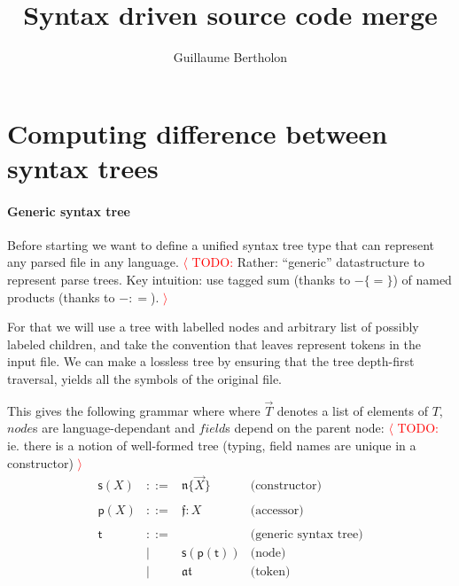 \documentclass[a4paper,11pt]{article}
\title{Syntax driven source code merge}
\author{Guillaume Bertholon}
\renewcommand\vec[1]{\overrightarrow{#1}}
\begin{document}
\maketitle

\newcommand{\TODO}[1]{\textcolor{red}{$\langle$ TODO:} #1 \textcolor{red}{$\rangle$}}


\newcommand{\aNode}{\ensuremath{\mathfrak{n}}}
\newcommand{\aField}{\ensuremath{\mathfrak{f}}}
\newcommand{\aAtom}{\ensuremath{\mathfrak{at}}}
\newcommand{\aTree}{\ensuremath{\mathsf{t}}}
\newcommand{\aSum}{\ensuremath{\mathsf{s}}}
\newcommand{\aProd}{\ensuremath{\mathsf{p}}}
\newcommand{\many}[1]{\ensuremath{\overrightarrow{#1}}}

\newcommand{\defNode}[2]{\ensuremath{#1 \{ #2 \}}}
\newcommand{\defField}[2]{\ensuremath{#1\!: #2}}



\section{Computing difference between syntax trees}

\paragraph{Generic syntax tree}
Before starting we want to define a unified syntax tree type that can
represent any parsed file in any language. \TODO{Rather: ``generic''
  datastructure to represent parse trees. Key intuition: use tagged
  sum (thanks to \defNode{-}{=}) of named products (thanks to
  \defField{-}{=}).}

For that we will use a tree with labelled
nodes and arbitrary list of possibly labeled children, and take the convention
that leaves represent tokens in the input file. We can make a lossless tree by
ensuring that the tree depth-first traversal, yields all the symbols of the
original file.

This gives the following grammar where where $\vec{T}$ denotes a list of
elements of $T$, $node$s are language-dependant and $field$s depend on the
parent node: \TODO{ie. there is a notion of well-formed tree (typing, field names are unique in a constructor)}
%
\[\begin{array}{lcll}
\aSum(X)  & ::= & \defNode{\aNode}{\many{X}} & \text{(constructor)} \\
\\
\aProd(X) & ::= & \defField{\aField}{X} & \text{(accessor)} \\
\\
\aTree & ::= & & \text{(generic syntax tree)} \\
       &  |  & \aSum(\aProd(\aTree)) & \text{(node)} \\
       &  |  & \aAtom & \text{(token)}
\end{array}\]
\end{document}
